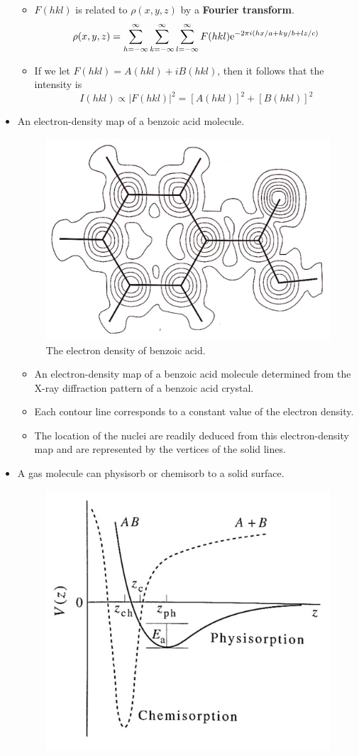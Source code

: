 \documentclass[../notes.tex]{subfiles}
\begin{document}
\begin{itemize}
\begin{itemize}
\begin{equation*}
        \end{equation*}
        \item $F(hkl)$ is related to $\rho(x,y,z)$ by a \textbf{Fourier transform}.
        \begin{equation*}
            \rho(x,y,z) = \sum_{h=-\infty}^\infty\sum_{k=-\infty}^\infty\sum_{l=-\infty}^\infty F(hkl)\e[-2\pi i(hx/a+ky/b+lz/c)]
        \end{equation*}
        \item If we let $F(hkl)=A(hkl)+iB(hkl)$, then it follows that the intensity is
        \begin{equation*}
            I(hkl) \propto |F(hkl)|^2 = [A(hkl)]^2+[B(hkl)]^2
        \end{equation*}
    \end{itemize}
    \item An electron-density map of a benzoic acid molecule.
    \begin{figure}[h!]
        \centering
        \includegraphics[width=0.4\linewidth]{../ExtFiles/benzoicAcidEdensity.png}
        \caption{The electron density of benzoic acid.}
        \label{fig:benzoicAcidEdensity}
    \end{figure}
    \begin{itemize}
        \item An electron-density map of a benzoic acid molecule determined from the X-ray diffraction pattern of a benzoic acid crystal.
        \item Each contour line corresponds to a constant value of the electron density.
        \item The location of the nuclei are readily deduced from this electron-density map and are represented by the vertices of the solid lines.
    \end{itemize}
    \item A gas molecule can physisorb or chemisorb to a solid surface.
    \begin{figure}[h!]
        \centering
        \includegraphics[width=0.36\linewidth]{../ExtFiles/PhysiChemiSorption.png}

\end{figure}
\end{itemize}
\end{document}
